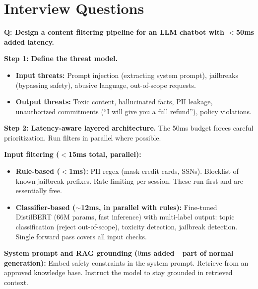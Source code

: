\section{Interview Questions}
\label{sec:safety_interview}


\begin{interviewq}
\textbf{Q: Design a content filtering pipeline for an LLM chatbot with $<$50ms added latency.}

 \quad {} \quad \badgefreq{\freqhigh}

\stronganswer

\textbf{Step 1: Define the threat model.}
\begin{itemize}
    \item \textbf{Input threats:} Prompt injection (extracting system prompt), jailbreaks (bypassing safety), abusive language, out-of-scope requests.
    \item \textbf{Output threats:} Toxic content, hallucinated facts, PII leakage, unauthorized commitments (``I will give you a full refund''), policy violations.
\end{itemize}

\textbf{Step 2: Latency-aware layered architecture.} The 50ms budget forces careful prioritization. Run filters in parallel where possible.

\textbf{Input filtering ($<$15ms total, parallel):}
\begin{itemize}
    \item \textbf{Rule-based ($<$1ms):} PII regex (mask credit cards, SSNs). Blocklist of known jailbreak prefixes. Rate limiting per session. These run first and are essentially free.
    \item \textbf{Classifier-based ($\sim$12ms, in parallel with rules):} Fine-tuned DistilBERT (66M params, fast inference) with multi-label output: topic classification (reject out-of-scope), toxicity detection, jailbreak detection. Single forward pass covers all input checks.
\end{itemize}

\textbf{System prompt and RAG grounding ($0$ms added---part of normal generation):} Embed safety constraints in the system prompt. Retrieve from an approved knowledge base. Instruct the model to stay grounded in retrieved context.


\end{interviewq}
